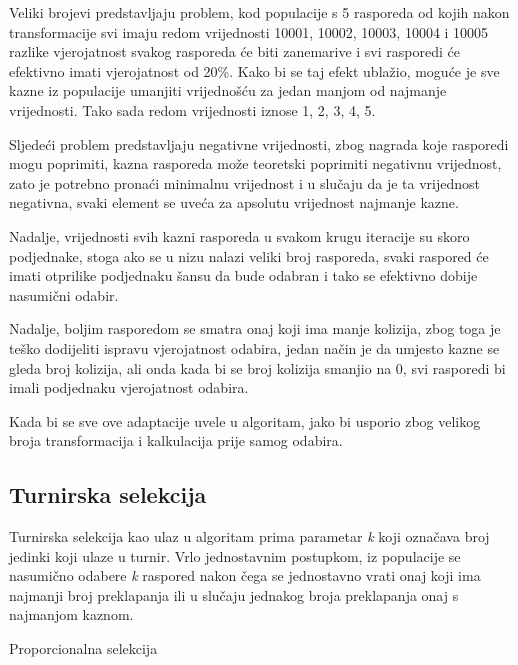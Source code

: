 \documentclass[times, utf8, zavrsni]{fer}
\begin{document}
Veliki brojevi predstavljaju problem, kod populacije s 5 rasporeda od kojih nakon transformacije svi imaju redom vrijednosti 10001, 10002, 10003, 10004 i 10005 razlike vjerojatnost svakog rasporeda će biti zanemarive i svi rasporedi će efektivno imati vjerojatnost od 20\%. Kako bi se taj efekt ublažio, moguće je sve kazne iz populacije umanjiti vrijednošću za jedan manjom od najmanje vrijednosti. Tako sada redom vrijednosti iznose 1, 2, 3, 4, 5.

Sljedeći problem predstavljaju negativne vrijednosti, zbog nagrada koje rasporedi mogu poprimiti, kazna rasporeda može teoretski poprimiti negativnu vrijednost, zato je potrebno pronaći minimalnu vrijednost i u slučaju da je ta vrijednost negativna, svaki element se uveća za apsolutu vrijednost najmanje kazne.

Nadalje, vrijednosti svih kazni rasporeda u svakom krugu iteracije su skoro podjednake, stoga ako se u nizu nalazi veliki broj rasporeda, svaki raspored će imati otprilike podjednaku šansu da bude odabran i tako se efektivno dobije nasumični odabir.

Nadalje, boljim rasporedom se smatra onaj koji ima manje kolizija, zbog toga je teško dodijeliti ispravu vjerojatnost odabira, jedan način je da umjesto kazne se gleda broj kolizija, ali onda kada bi se broj kolizija smanjio na 0, svi rasporedi bi imali podjednaku vjerojatnost odabira.

Kada bi se sve ove adaptacije uvele u algoritam, jako bi usporio zbog velikog broja transformacija i kalkulacija prije samog odabira.

\subsection{Turnirska selekcija}

Turnirska selekcija kao ulaz u algoritam prima parametar \emph{k} koji označava broj jedinki koji ulaze u turnir. Vrlo jednostavnim postupkom, iz populacije se nasumično odabere \emph{k} raspored nakon čega se jednostavno vrati onaj koji ima najmanji broj preklapanja ili u slučaju jednakog broja preklapanja onaj s najmanjom kaznom.

\begin{algorithm}
\caption{Proporcionalna selekcija}
\label{algo:proporcionalno}
\begin{algorithmic}
\ENDIF
\ENDWHILE
{}
\end{algorithmic}
\end{algorithm}
\end{document}
